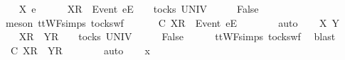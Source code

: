 \ \ \isamarkupfalse%
\ X\ e\ {\isasymrho}\ {\isasymsigma}{\isacharprime}{\isacharprime}\isanewline
\ \ \isamarkupfalse%
\ {\isachardoublequoteopen}{\isacharbrackleft}X{\isacharbrackright}\isactrlsub R\ {\isacharhash}\ {\isacharbrackleft}Event\ e{\isacharbrackright}\isactrlsub E\ {\isacharhash}\ {\isasymsigma}{\isacharprime}{\isacharprime}\ {\isasymin}\ tocks\ UNIV{\isachardoublequoteclose}\isanewline
\ \ \isamarkupfalse%
\ \isamarkupfalse%
\ {\isachardoublequoteopen}False{\isachardoublequoteclose}\isanewline
\ \ \ \ \isamarkupfalse%
\ {\isacharparenleft}meson\ ttWF{\isachardot}simps{\isacharparenleft}{}{}{\isacharparenright}\ tocks{\isacharunderscore}wf{\isacharparenright}\isanewline
\ \ \isamarkupfalse%
\ \isamarkupfalse%
\ {\isachardoublequoteopen}{\isasymrho}\ {\isasymlesssim}\isactrlsub C\ {\isacharbrackleft}X{\isacharbrackright}\isactrlsub R\ {\isacharhash}\ {\isacharbrackleft}Event\ e{\isacharbrackright}\isactrlsub E\ {\isacharhash}\ {\isasymsigma}{\isacharprime}{\isacharprime}{\isachardoublequoteclose}\isanewline
\ \ \ \ \isamarkupfalse%
\ auto\isanewline
{}\isamarkupfalse%
\isanewline
\ \ \isamarkupfalse%
\ X\ Y\ {\isasymrho}\ {\isasymsigma}{\isacharprime}{\isacharprime}\isanewline
\ \ \isamarkupfalse%
\ {\isachardoublequoteopen}{\isacharbrackleft}X{\isacharbrackright}\isactrlsub R\ {\isacharhash}\ {\isacharbrackleft}Y{\isacharbrackright}\isactrlsub R\ {\isacharhash}\ {\isasymsigma}{\isacharprime}{\isacharprime}\ {\isasymin}\ tocks\ UNIV{\isachardoublequoteclose}\isanewline
\ \ \isamarkupfalse%
\ \isamarkupfalse%
\ {\isachardoublequoteopen}False{\isachardoublequoteclose}\isanewline
\ \ \ \ \isamarkupfalse%
\ ttWF{\isachardot}simps{\isacharparenleft}{}{}{\isacharparenright}\ tocks{\isacharunderscore}wf\ \isamarkupfalse%
\ blast\isanewline
\ \ \isamarkupfalse%
\ \isamarkupfalse%
\ {\isachardoublequoteopen}{\isasymrho}\ {\isasymlesssim}\isactrlsub C\ {\isacharbrackleft}X{\isacharbrackright}\isactrlsub R\ {\isacharhash}\ {\isacharbrackleft}Y{\isacharbrackright}\isactrlsub R\ {\isacharhash}\ {\isasymsigma}{\isacharprime}{\isacharprime}{\isachardoublequoteclose}\isanewline
\ \ \ \ \isamarkupfalse%
\ auto\isanewline
{}\isamarkupfalse%
\isanewline
\ \ \isamarkupfalse%
\ x\ {\isasymrho}\ {\isasymsigma}{\isacharprime}{\isacharprime}\isanewline
